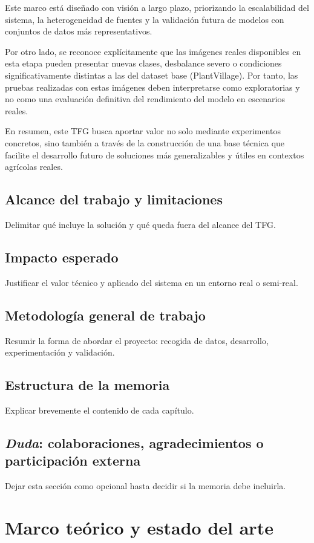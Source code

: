 \documentclass[11pt,spanish,listoffigures,listoftables]{tfgetsinf}
\begin{document}
Este marco está diseñado con visión a largo plazo, priorizando la escalabilidad del sistema, la heterogeneidad de fuentes y la validación futura de modelos con conjuntos de datos más representativos.

Por otro lado, se reconoce explícitamente que las imágenes reales disponibles en esta etapa pueden presentar nuevas clases, desbalance severo o condiciones significativamente distintas a las del dataset base (PlantVillage). Por tanto, las pruebas realizadas con estas imágenes deben interpretarse como exploratorias y no como una evaluación definitiva del rendimiento del modelo en escenarios reales.

En resumen, este TFG busca aportar valor no solo mediante experimentos concretos, sino también a través de la construcción de una base técnica que facilite el desarrollo futuro de soluciones más generalizables y útiles en contextos agrícolas reales.

\section{Alcance del trabajo y limitaciones}
Delimitar qué incluye la solución y qué queda fuera del alcance del TFG.

\section{Impacto esperado}
Justificar el valor técnico y aplicado del sistema en un entorno real o semi-real.

\section{Metodología general de trabajo}
Resumir la forma de abordar el proyecto: recogida de datos, desarrollo, experimentación y validación.

\section{Estructura de la memoria}
Explicar brevemente el contenido de cada capítulo.

\section{\textit{Duda}: colaboraciones, agradecimientos o participación externa}
Dejar esta sección como opcional hasta decidir si la memoria debe incluirla.

\chapter{Marco teórico y estado del arte}
\end{document}
